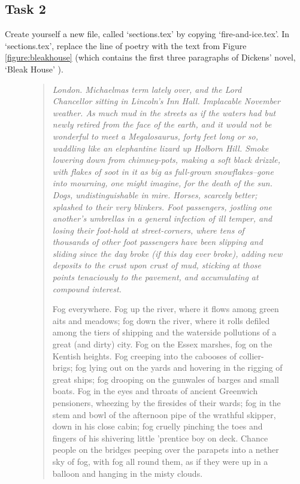 \subsection{Task 2}
\label{sec:task-2}

 Create yourself a new file, called `sections.tex' by copying `fire-and-ice.tex'. In `sections.tex', replace the line of poetry with the text from Figure \ref{figure:bleakhouse} (which contains the first three paragraphs of Dickens' novel, `Bleak House' \citep{dickens1852}).

\begin{figure}[tbp]

\begin{quote}

\itshape
London. Michaelmas term lately over, and the Lord Chancellor sitting
in Lincoln's Inn Hall. Implacable November weather. As much mud in
the streets as if the waters had but newly retired from the face of
the earth, and it would not be wonderful to meet a Megalosaurus,
forty feet long or so, waddling like an elephantine lizard up Holborn
Hill. Smoke lowering down from chimney-pots, making a soft black
drizzle, with flakes of soot in it as big as full-grown
snowflakes--gone into mourning, one might imagine, for the death of
the sun. Dogs, undistinguishable in mire. Horses, scarcely better;
splashed to their very blinkers. Foot passengers, jostling one
another's umbrellas in a general infection of ill temper, and losing
their foot-hold at street-corners, where tens of thousands of other
foot passengers have been slipping and sliding since the day broke
(if this day ever broke), adding new deposits to the crust upon crust
of mud, sticking at those points tenaciously to the pavement, and
accumulating at compound interest.



Fog everywhere. Fog up the river, where it flows among green aits and
meadows; fog down the river, where it rolls defiled among the tiers
of shipping and the waterside pollutions of a great (and dirty) city.
Fog on the Essex marshes, fog on the Kentish heights. Fog creeping
into the cabooses of collier-brigs; fog lying out on the yards and
hovering in the rigging of great ships; fog drooping on the gunwales
of barges and small boats. Fog in the eyes and throats of ancient
Greenwich pensioners, wheezing by the firesides of their wards; fog
in the stem and bowl of the afternoon pipe of the wrathful skipper,
down in his close cabin; fog cruelly pinching the toes and fingers of
his shivering little 'prentice boy on deck. Chance people on the
bridges peeping over the parapets into a nether sky of fog, with fog
all round them, as if they were up in a balloon and hanging in the
misty clouds.


\end{quote}
\end{figure}
